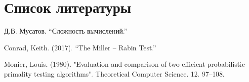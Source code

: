\documentclass[12pt]{article}
\theoremstyle{definition}
\numberwithin{Def}{section}
\numberwithin{Th}{section}
\numberwithin{St}{section}
\begin{document}
\section{Список литературы}

\begin{enumerate}[{[}1{]}]
	\item Д.В. Мусатов. “Сложность вычислений.”
	\item \label{Conrad} Conrad, Keith. (2017). “The Miller – Rabin Test.”
	\item \label{Monier} Monier, Louis. (1980). "Evaluation and comparison of two efficient
	probabilistic primality testing algorithms".
	Theoretical Computer Science. 12. 97–108.
\end{enumerate}
\end{document}
